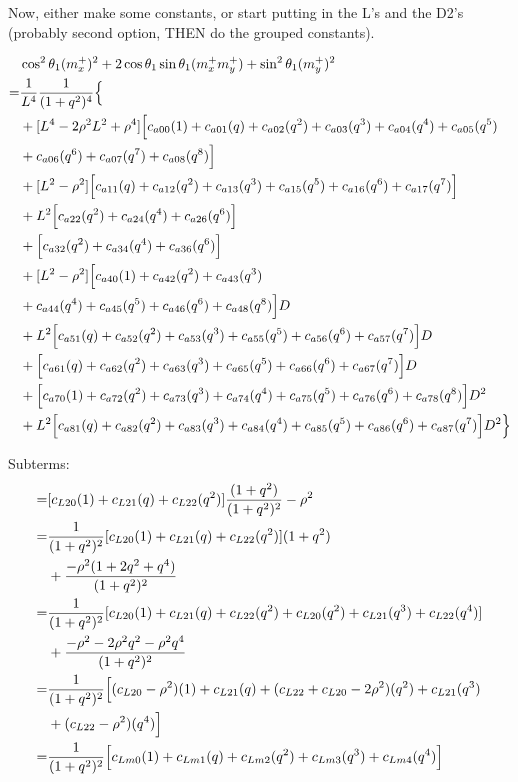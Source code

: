 \documentclass[12pt]{article}
\begin{document}
Now, either make some constants, or start putting in the L's and the D2's (probably second option, THEN do the grouped constants).

\begin{align}
    &\cos^2\theta_1(m_x^+)^2  + 2\cos\theta_1\sin\theta_1(m_x^+m_y^+)  +\sin^2\theta_1(m_y^+)^2 \\
    =& \frac{1}{L^4} \frac{1}{(1+q^2)^4} \Bigl\{ \nonumber\\
    &+ [ L^4 -2\rho^2L^2 + \rho^4 ]\Bigl[ c_{a00}(1) + c_{a01}(q) + c_{a02}(q^2) + c_{a03}(q^3) + c_{a04}(q^4) + c_{a05}(q^5) \nonumber\\
    &+ c_{a06}(q^6) + c_{a07}(q^7) +c_{a08}(q^8)  \Bigr] \nonumber\\
    &+ [ L^2 - \rho^2 ]\Bigl[ c_{a11}(q) + c_{a12}(q^2) + c_{a13}(q^3) + c_{a15}(q^5) + c_{a16}(q^6) + c_{a17}(q^7) \Bigr] \nonumber\\
    &+ L^2\Bigl[ c_{a22}(q^2) + c_{a24}(q^4)+ c_{a26}(q^6) \Bigr] \nonumber\\
    &+ \Bigl[ c_{a32}(q^2) + c_{a34}(q^4) +c_{a36}(q^6) \Bigr] \nonumber\\
    &+ [ L^2 - \rho^2 ]\Bigl[ c_{a40}(1) + c_{a42}(q^2) + c_{a43}(q^3) \nonumber\\
    &+ c_{a44}(q^4) + c_{a45}(q^5) + c_{a46}(q^6) + c_{a48}(q^8)   \Bigr]D \nonumber\\
    &+ L^2\Bigl[ c_{a51}(q) + c_{a52}(q^2)+  c_{a53}(q^3) + c_{a55}(q^5) + c_{a56}(q^6)+  c_{a57}(q^7) \Bigr]D \nonumber\\
    &+ \Bigl[  c_{a61}(q)  + c_{a62}(q^2) +  c_{a63}(q^3) +c_{a65}(q^5) + c_{a66}(q^6) +c_{a67}(q^7)  \Bigr]D \nonumber\\
    &+ \Bigl[ c_{a70}(1) + c_{a72}(q^2) + c_{a73}(q^3) + c_{a74}(q^4) + c_{a75}(q^5) +  c_{a76}(q^6) + c_{a78}(q^8) \Bigr]D^2 \nonumber\\
    &+ L^2\Bigl[ c_{a81}(q) + c_{a82}(q^2) + c_{a83}(q^3) + c_{a84}(q^4) + c_{a85}(q^5) + c_{a86}(q^6) + c_{a87}(q^7) \Bigr]D^2 \Bigr\}
\end{align}

Subterms:
\begin{align}
    [ L^2 - \rho^2 ] =& [ c_{L20}(1) + c_{L21}(q)  + c_{L22}(q^2)]\frac{(1+q^2)}{(1+q^2)^2} - \rho^2\\
    =& \frac{1}{(1+q^2)^2}[ c_{L20}(1) + c_{L21}(q)  + c_{L22}(q^2)](1+q^2) \nonumber\\
    &+  \frac{ - \rho^2 (1+2q^2+q^4)}{(1+q^2)^2} \\
    =& \frac{1}{(1+q^2)^2}[ c_{L20}(1) + c_{L21}(q)  + c_{L22}(q^2) + c_{L20}(q^2) + c_{L21}(q^3)  + c_{L22}(q^4)] \nonumber\\
    &+  \frac{ - \rho^2 - 2\rho^2q^2 - \rho^2q^4}{(1+q^2)^2}\\
    =& \frac{1}{(1+q^2)^2} \Bigl[ (c_{L20}- \rho^2)(1) + c_{L21}(q)  + (c_{L22} + c_{L20} -2\rho^2)(q^2) + c_{L21}(q^3) \nonumber\\
    &+ (c_{L22} -\rho^2)(q^4)  \Bigr] \\
    =& \frac{1}{(1+q^2)^2} \Bigl[ c_{Lm0}(1) + c_{Lm1}(q)  + c_{Lm2}(q^2) + c_{Lm3}(q^3) + c_{Lm4}(q^4)  \Bigr]
\end{align}
\end{document}
